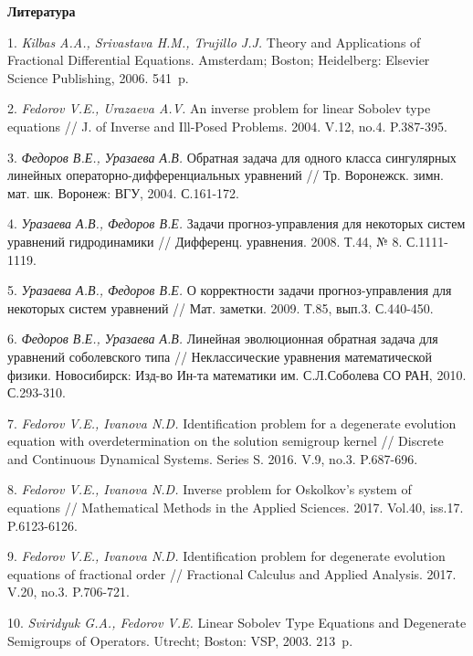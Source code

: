 \smallskip \centerline{\bf Литература}\nopagebreak


1. {\it Kilbas A.A., Srivastava H.M., Trujillo J.J.}
Theory and Applications of Fractional Differential Equations. Amsterdam; Boston; Heidelberg: Elsevier Science Publishing, 2006. 541~p.

2.	{\it Fedorov V.E., Urazaeva A.V.} An inverse problem for linear Sobolev type equations // J. of Inverse and Ill-Posed Problems. 2004. V.12, no.4. P.387-395.

3.	{\it Федоров В.Е., Уразаева А.В.} Обратная задача для одного класса сингулярных линейных операторно-диф\-фе\-рен\-ци\-аль\-ных уравнений // Тр. Воронежск. зимн. мат. шк. Воронеж: ВГУ, 2004. С.161-172.

4.	{\it Уразаева А.В., Федоров В.Е.} Задачи прогноз-управ\-ле\-ния для некоторых систем уравнений гидродинамики // Дифференц. уравнения. 2008. Т.44, № 8. С.1111-1119.

5.	{\it Уразаева А.В., Федоров В.Е.} О корректности задачи прогноз-управления для некоторых систем уравнений // Мат. заметки. 2009. Т.85, вып.3. С.440-450.

6.	{\it Федоров В.Е., Уразаева А.В.} Линейная эволюционная обратная задача для уравнений соболевского типа // Неклассические уравнения математической физики. Новосибирск: Изд-во Ин-та математики им. С.Л.Соболева СО РАН, 2010. С.293-310.

7.	{\it Fedorov V.E., Ivanova N.D.} Identification problem for a degenerate evolution equation with overdetermination on the solution semigroup kernel // Discrete and Continuous Dyna\-mi\-cal Systems. Series S. 2016. V.9, no.3. P.687-696.

8.	{\it Fedorov V.E., Ivanova N.D.} Inverse problem for Oskol\-kov’s system of equations // Mathematical Methods in the Applied Sciences. 2017. Vol.40, iss.17. P.6123-6126.

9.	{\it Fedorov V.E., Ivanova N.D.} Identification problem for degenerate evolution equations of fractional order // Fractional Calculus and Applied Analysis. 2017. V.20, no.3. P.706-721.

10.	{\it Sviridyuk G.A., Fedorov V.E.} Linear Sobolev Type Equ\-a\-ti\-ons and Degenerate Semigroups of Operators. Utrecht; Bos\-ton: VSP, 2003. 213~p.
